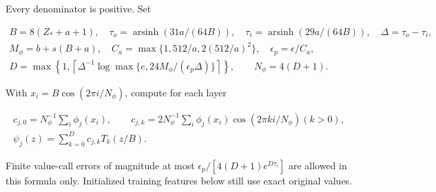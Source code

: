 Every denominator is positive. Set

\begin{equation}
\label{cp:init:eq:activation-degree}
\begin{gathered}
B=8(Z_*+a+1),\quad
\tau_o=\operatorname{arsinh}(31a/(64B)),\quad
\tau_i=\operatorname{arsinh}(29a/(64B)),\quad\Delta=\tau_o-\tau_i,\\
M_\phi=b+s(B+a),\quad C_a=\max\{1,512/a,2(512/a)^2\},
 \quad\epsilon_p=\epsilon/C_a,\\
D=\max\left\{1,\left\lceil\Delta^{-1}
       \log\max\{e,24M_\phi/(\epsilon_p\Delta)\}\right\rceil\right\},
 \qquad N_\phi=4(D+1).
\end{gathered}
\end{equation}

With $x_i=B\cos(2\pi i/N_\phi)$, compute for each layer

\begin{equation}
\label{cp:init:eq:activation-polynomial}
\begin{gathered}
c_{j,0}=N_\phi^{-1}\sum_i\phi_j(x_i),\qquad
c_{j,k}=2N_\phi^{-1}\sum_i\phi_j(x_i)\cos(2\pi ki/N_\phi) (k>0),\\
\psi_j(z)=\sum_{k=0}^Dc_{j,k}T_k(z/B).
\end{gathered}
\end{equation}

Finite value-call errors of magnitude at most
$\epsilon_p/[4(D+1)e^{D\tau_i}]$ are allowed in this formula only.
Initialized training features below still use exact original values.

